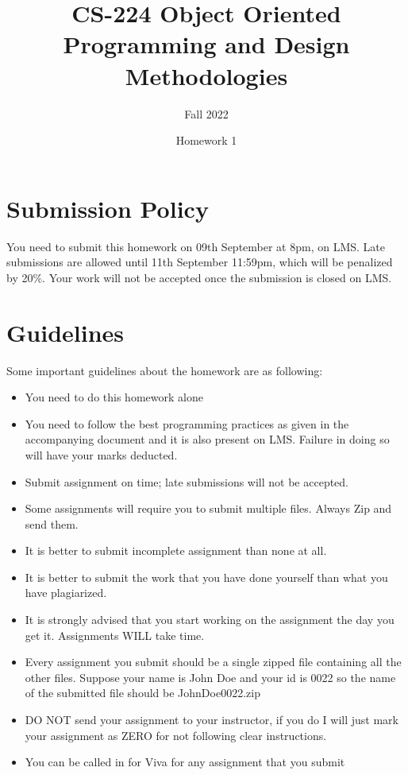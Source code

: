 \documentclass[a4paper,12pt]{article}
\begin{document}
	
	\title{CS-224 Object Oriented Programming and Design Methodologies }
	\author{Fall 2022}
	\date{Homework 1}
	\maketitle
	\section{Submission Policy}
	You need to submit this homework on  {\color{blue}09th September at 8pm}, on LMS. Late submissions are allowed until {\color{red} 11th September 11:59pm}, which will be penalized by 20\%. Your work will not be accepted once the submission is closed on LMS.
	
	\section{Guidelines}
		Some important guidelines about the homework are as following:
	\begin{itemize}
		\item You need to do this homework alone

		\item You need to follow the best programming practices as given in the accompanying document and it is also present on LMS. Failure in doing so will have your marks deducted.
		\item Submit assignment on time; late submissions will not be accepted.
		\item Some assignments will require you to submit multiple files. Always Zip and send them.
		\item It is better to submit incomplete assignment than none at all.
		\item It is better to submit the work that you have done yourself than what you have plagiarized.
		\item It is strongly advised that you start working on the assignment the day you get it. Assignments WILL take time.
		\item Every assignment you submit should be a single zipped file containing all the other files. Suppose your name is John Doe and your id is 0022 so the name of the submitted file should be JohnDoe0022.zip
		\item DO NOT send your assignment to your instructor, if you do I will just mark your assignment as ZERO for not following clear instructions.
		\item You can be called in for Viva for any assignment that you submit
	\end{itemize}
	
\end{document}
